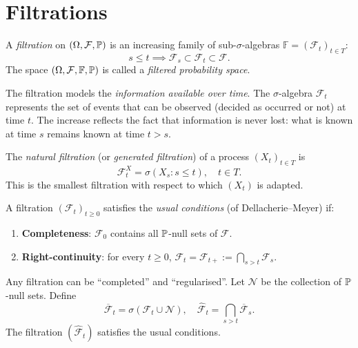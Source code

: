 \section{Filtrations}

\begin{definition}[Filtration]
\label{def:filtration}
A \emph{filtration} on $(\Omega, \mathcal{F}, \mathbb{P})$ is an increasing family
of sub-$\sigma$-algebras $\mathbb{F} = (\mathcal{F}_t)_{t \in T}$:
\[
  s \leq t \implies \mathcal{F}_s \subset \mathcal{F}_t \subset \mathcal{F}.
\]
The space $(\Omega, \mathcal{F}, \mathbb{F}, \mathbb{P})$ is called a
\emph{filtered probability space}.
\end{definition}

\begin{intuition}[title=\textbf{Increasing Information}]
The filtration models the \emph{information available over time}. The
$\sigma$-algebra $\mathcal{F}_t$ represents the set of events that can be
observed (decided as occurred or not) at time $t$. The increase reflects the
fact that information is never lost: what is known at time $s$ remains known
at time $t > s$.
\end{intuition}

\begin{definition}
The \emph{natural filtration} (or \emph{generated filtration}) of a process
$(X_t)_{t \in T}$ is
\[
  \mathcal{F}_t^X = \sigma(X_s : s \leq t), \quad t \in T.
\]
This is the smallest filtration with respect to which $(X_t)$ is adapted.
\end{definition}

\begin{definition}
\label{def:usual_conditions}
A filtration $(\mathcal{F}_t)_{t \geq 0}$ satisfies the \emph{usual conditions}
(of Dellacherie--Meyer) if:
\begin{enumerate}
  \item \textbf{Completeness}: $\mathcal{F}_0$ contains all $\mathbb{P}$-null sets
    of $\mathcal{F}$.
  \item \textbf{Right-continuity}: for every $t \geq 0$,
    $\mathcal{F}_t = \mathcal{F}_{t+} := \bigcap_{s > t} \mathcal{F}_s$.
\end{enumerate}
\end{definition}

\begin{remark}
Any filtration can be ``completed'' and ``regularised''. Let $\mathcal{N}$
be the collection of $\mathbb{P}$-null sets. Define
\[
  \overline{\mathcal{F}}_t = \sigma(\mathcal{F}_t \cup \mathcal{N}), \quad
  \widehat{\mathcal{F}}_t = \bigcap_{s > t} \overline{\mathcal{F}}_s.
\]
The filtration $(\widehat{\mathcal{F}}_t)$ satisfies the usual conditions.
\end{remark}

